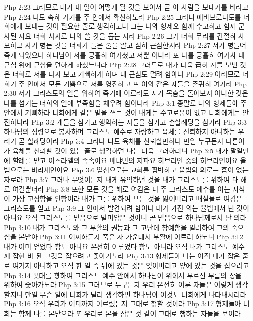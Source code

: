 Php 2:23  그러므로 내가 내 일이 어떻게 될 것을 보아서 곧 이 사람을 보내기를 바라고
Php 2:24  나도 속히 가기를 주 안에서 확신하노라
Php 2:25  그러나 에바브로디도를 너희에게 보내는 것이 필요한 줄로 생각하노니 그는 나의 형제요 함께 수고하고 함께 군사된 자요 너희 사자로 나의 쓸 것을 돕는 자라
Php 2:26  그가 너희 무리를 간절히 사모하고 자기 병든 것을 너희가 들은 줄을 알고 심히 근심한지라
Php 2:27  저가 병들어 죽게 되었으나 하나님이 저를 긍휼히 여기셨고 저뿐 아니라 또 나를 긍휼히 여기사 내 근심 위에 근심을 면하게 하셨느니라
Php 2:28  그러므로 내가 더욱 급히 저를 보낸 것은 너희로 저를 다시 보고 기뻐하게 하며 내 근심도 덜려 함이니
Php 2:29  이러므로 너희가 주 안에서 모든 기쁨으로 저를 영접하고 또 이와 같은 자들을 존귀히 여기라
Php 2:30  저가 그리스도의 일을 위하여 죽기에 이르러도 자기 목숨을 돌아보지 아니한 것은 나를 섬기는 너희의 일에 부족함을 채우려 함이니라
Php 3:1  종말로 나의 형제들아 주 안에서 기뻐하라 너희에게 같은 말을 쓰는 것이 내게는 수고로움이 없고 너희에게는 안전하니라
Php 3:2  개들을 삼가고 행악하는 자들을 삼가고 손할례당을 삼가라
Php 3:3  하나님의 성령으로 봉사하며 그리스도 예수로 자랑하고 육체를 신뢰하지 아니하는 우리가 곧 할례당이라
Php 3:4  그러나 나도 육체를 신뢰할만하니 만일 누구든지 다른이가 육체를 신뢰할 것이 있는 줄로 생각하면 나는 더욱 그러하리니
Php 3:5  내가 팔일만에 할례를 받고 이스라엘의 족속이요 베냐민의 지파요 히브리인 중의 히브리인이요 율법으로는 바리새인이요
Php 3:6  열심으로는 교회를 핍박하고 율법의 의로는 흠이 없는 자로라
Php 3:7  그러나 무엇이든지 내게 유익하던 것을 내가 그리스도를 위하여 다 해로 여길뿐더러
Php 3:8  또한 모든 것을 해로 여김은 내 주 그리스도 예수를 아는 지식이 가장 고상함을 인함이라 내가 그를 위하여 모든 것을 잃어버리고 배설물로 여김은 그리스도를 얻고
Php 3:9  그 안에서 발견되려 함이니 내가 가진 의는 율법에서 난 것이 아니요 오직 그리스도를 믿음으로 말미암은 것이니 곧 믿음으로 하나님께로서 난 의라
Php 3:10  내가 그리스도와 그 부활의 권능과 그 고난에 참예함을 알려하여 그의 죽으심을 본받아
Php 3:11  어찌하든지 죽은 자 가운데서 부활에 이르려 하노니
Php 3:12  내가 이미 얻었다 함도 아니요 온전히 이루었다 함도 아니라 오직 내가 그리스도 예수께 잡힌 바 된 그것을 잡으려고 좇아가노라
Php 3:13  형제들아 나는 아직 내가 잡은 줄로 여기지 아니하고 오직 한 일 즉 뒤에 있는 것은 잊어버리고 앞에 있는 것을 잡으려고
Php 3:14  푯대를 향하여 그리스도 예수 안에서 하나님이 위에서 부르신 부름의 상을 위하여 좇아가노라
Php 3:15  그러므로 누구든지 우리 온전히 이룬 자들은 이렇게 생각할지니 만일 무슨 일에 너희가 달리 생각하면 하나님이 이것도 너희에게 나타내시리라
Php 3:16  오직 우리가 어디까지 이르렀든지 그대로 행할 것이라
Php 3:17  형제들아 너희는 함께 나를 본받으라 또 우리로 본을 삼은 것 같이 그대로 행하는 자들을 보이라
